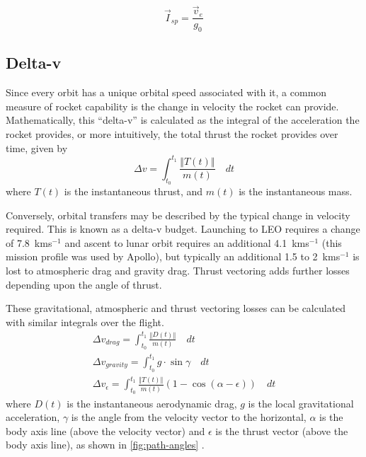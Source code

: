 \begin{equation}
\vec{I}_{sp}=\frac{\vec{v}_e}{g_0}
\end{equation}

\subsection{Delta-v} \label{sub:Delta-v}

Since every orbit has a unique orbital speed associated with it, a common measure of rocket capability is the change in velocity the rocket can provide. Mathematically, this \enquote{delta-v} is calculated as the integral of the acceleration the rocket provides, or more intuitively, the total thrust the rocket provides over time, given by
\begin{equation}\label{eq:Delta-V}
\Delta v=\int_{t_{0}}^{t_{1}}\frac{\left\Vert T\left(t\right)\right\Vert }{m\left(t\right)}\quad dt
\end{equation}
where $T\left(t\right)$ is the instantaneous thrust, and $m\left(t\right)$ is the instantaneous mass.

Conversely, orbital transfers may be described by the typical change in velocity required. This is known as a delta-v budget. Launching to LEO requires a change of 7.8~kms$^{-1}$ and ascent to lunar orbit requires an additional 4.1~kms$^{-1}$ (this mission profile was used by Apollo), but typically an additional 1.5 to 2~kms$^{-1}$ is lost to atmospheric drag and gravity drag. Thrust vectoring adds further losses depending upon the angle of thrust. 

These gravitational, atmospheric and thrust vectoring losses can be calculated with similar integrals over the flight. 
\begin{subequations}
\begin{gather}
\Delta v_{drag}=\int_{t_0}^{t_1}\frac{\left\Vert D\left(t\right)\right\Vert }{m\left(t\right)}\quad dt\label{eq:drag-penalty} \\
\Delta v_{gravity}=\int_{t_0}^{t_1}g\cdot\sin\gamma\quad dt\label{eq:gravity-penalty} \\
\Delta v_\epsilon=\int_{t_0}^{t_1}\frac{\left\Vert T\left(t\right)\right\Vert }{m\left(t\right)}(1-\cos(\alpha-\epsilon))\quad dt\label{eq:thrust-vectoring-penalty}
\end{gather}
\end{subequations}
where $D(t)$ is the instantaneous aerodynamic drag, $g$ is the local gravitational acceleration, $\gamma$ is the angle from the velocity vector to the horizontal, $\alpha$ is the body axis line (above the velocity vector) and $\epsilon$ is the thrust vector (above the body axis line), as shown in \autoref{fig:path-angles} \parencite{Tetlow2003}. 


